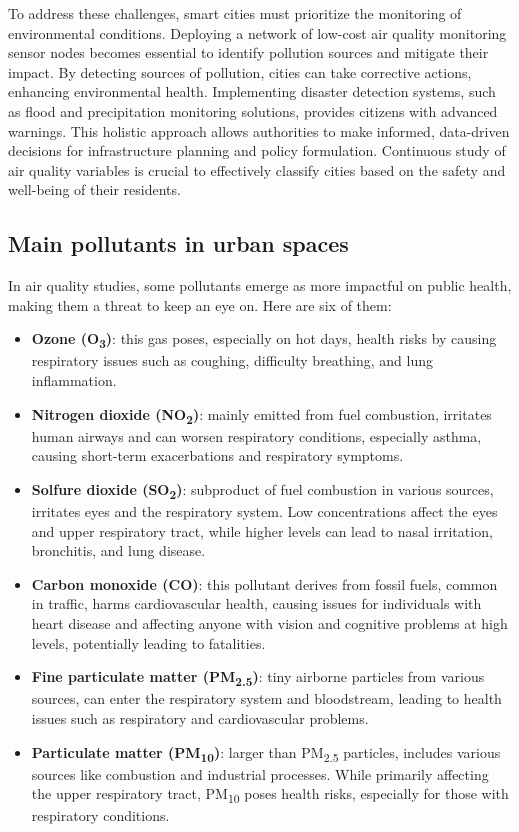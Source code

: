 To address these challenges, smart cities must prioritize the monitoring of environmental conditions. Deploying a network of low-cost air quality monitoring sensor nodes becomes essential to identify pollution sources and mitigate their impact. By detecting sources of pollution, cities can take corrective actions, enhancing environmental health. Implementing disaster detection systems, such as flood and precipitation monitoring solutions, provides citizens with advanced warnings. This holistic approach allows authorities to make informed, data-driven decisions for infrastructure planning and policy formulation. Continuous study of air quality variables is crucial to effectively classify cities based on the safety and well-being of their residents.

\subsection{Main pollutants in urban spaces}

In air quality studies, some pollutants emerge as more impactful on public health, making them a threat to keep an eye on. Here are six of them:
\begin{itemize}
    \item \textbf{Ozone (O\textsubscript{3})}: this gas poses, especially on hot days, health risks by causing respiratory issues such as coughing, difficulty breathing, and lung inflammation.
    \item \textbf{Nitrogen dioxide (NO\textsubscript{2})}: mainly emitted from fuel combustion, irritates human airways and can worsen respiratory conditions, especially asthma, causing short-term exacerbations and respiratory symptoms.
    \item \textbf{Solfure dioxide (SO\textsubscript{2})}: subproduct of fuel combustion in various sources, irritates eyes and the respiratory system. Low concentrations affect the eyes and upper respiratory tract, while higher levels can lead to nasal irritation, bronchitis, and lung disease.
    \item \textbf{Carbon monoxide (CO)}: this pollutant derives from fossil fuels, common in traffic, harms cardiovascular health, causing issues for individuals with heart disease and affecting anyone with vision and cognitive problems at high levels, potentially leading to fatalities.
    \item \textbf{Fine particulate matter (PM\textsubscript{2.5})}: tiny airborne particles from various sources, can enter the respiratory system and bloodstream, leading to health issues such as respiratory and cardiovascular problems.
    \item \textbf{Particulate matter (PM\textsubscript{10})}: larger than PM\textsubscript{2.5} particles, includes various sources like combustion and industrial processes. While primarily affecting the upper respiratory tract, PM\textsubscript{10} poses health risks, especially for those with respiratory conditions. 
\end{itemize}


